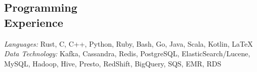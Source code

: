 \documentclass[margin,line]{resume}
\begin{document}
\begin{resume}
    \vspace{3mm}
    
    \section{\mysidestyle Programming\\Experience}

    \emph{Languages:} Rust, C, C++, Python, Ruby, Bash, Go, Java, Scala, Kotlin, \LaTeX \\
    \emph{Data Technology:} Kafka, Cassandra, Redis, PostgreSQL, ElasticSearch/Lucene,
     MySQL, Hadoop, Hive, Presto, RedShift, BigQuery, SQS, EMR, RDS

\end{resume}
\end{document}
